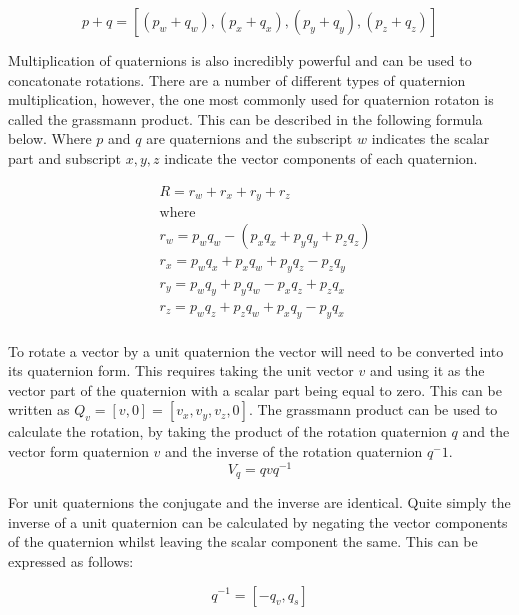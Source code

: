 \begin{equation}
p + q = [(p_w + q_w), (p_x + q_x), (p_y + q_y), (p_z + q_z)]
\end{equation}

\noindent
Multiplication of quaternions is also incredibly powerful and can be used to concatonate rotations. There are a number of different types of quaternion multiplication, however, the one most commonly used for quaternion rotaton is called the grassmann product. This can be described in the following formula below. Where $p$ and $q$ are quaternions and the subscript $w$ indicates the scalar part and subscript $x, y, z$ indicate the vector components of each quaternion.

\begin{equation}
\begin{aligned}
& R = r_w + r_x + r_y + r_z\\
& \text{where}\\
& r_w = p_w q_w - (p_x q_x + p_y q_y + p_z q_z)\\
& r_x = p_w q_x + p_x q_w + p_y q_z - p_z q_y\\
& r_y = p_w q_y + p_y q_w - p_x q_z + p_z q_x\\
& r_z = p_w q_z + p_z q_w + p_x q_y - p_y q_x\\
\end{aligned}
\end{equation}

\noindent
To rotate a vector by a unit quaternion the vector will need to be converted into its quaternion form. This requires taking the unit vector $v$ and using it as the vector part of the quaternion with a scalar part being equal to zero. This can be written as $Q_v = [v, 0] = [v_x, v_y, v_z, 0]$. The grassmann product can be used to calculate the rotation, by taking the product of the rotation quaternion $q$ and the vector form quaternion $v$ and the inverse of the rotation quaternion $q^-1$. \\

\begin{equation}
	V_q = qvq^{-1}
\end{equation}

\noindent
For unit quaternions the conjugate and the inverse are identical. Quite simply the inverse of a unit quaternion can be calculated by negating the vector components of the quaternion whilst leaving the scalar component the same. This can be expressed as follows:

\begin{equation}
	q^{-1} = [-q_v, q_s]
\end{equation}

